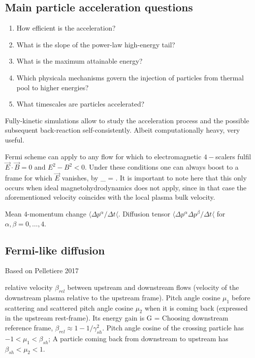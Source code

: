 \documentclass{aa}
\begin{document}
\subsection{Main particle acceleration questions}

\begin{enumerate}
    \item How efficient is the acceleration?
    \item What is the slope of the power-law high-energy tail?
    \item What is the maximum attainable energy?
    \item Which physicala mechanisms govern the injection of particles from thermal pool to higher energies?
    \item What timescales are particles accelerated?
\end{enumerate}

Fully-kinetic simulations allow to study the acceleration process and the possible subsequent back-reaction self-consistently.
Albeit computationally heavy, very useful.


\citep{Fermi_1949}
\citep{Fermi_1954}
\citep{Lemoine_2019}

Fermi scheme can apply to any flow for which to electromagnetic $4-$scalers fulfil $\vec{E} \cdot \vec{B} = 0$ and $E^2 - B^2 < 0$.
Under these conditions one can always boost to a frame for which $\vec{E}$ vanishes, by
\be
\vec{\beta}_{} = .
\ee
It is important to note here that this only occurs when ideal magnetohydrodynamics does not apply, since in that case the aforementioned velocity coincides with the local plasma bulk velocity.


Mean $4$-momentum change $\langle \Delta p^\alpha / \Delta t \langle$.
Diffusion tensor $\langle \Delta p^\alpha \Delta p^\beta / \Delta t \langle$ for $\alpha,\beta = 0,\ldots,4$.

\subsection{Fermi-like diffusion}
Based on Pelletiere 2017

relative velocity $\beta_{rel}$ between upstream and downstream flows (velocity of the downstream plasma relative to the upstream frame).
Pitch angle cosine $\mu_1$ before scattering and scattered pitch angle cosine $\mu_2$ when it is coming back (expressed in the upstream rest-frame).
Its energy gain is 
\be
G = 
\ee
Choosing downstream reference frame, $\beta_{rel} \approx 1-1/\gamma_{sh}^2$.
Pitch angle cosine of the crossing particle has $-1 < \mu_1 < \beta_{sh}$; 
A particle coming back from downstream to upstream has $\beta_{sh} < \mu_2 < 1$.
\end{document}
